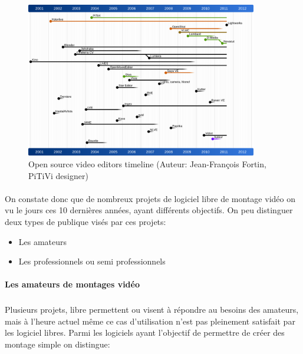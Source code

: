 \begin{figure} [h]
  \begin{center}
    \includegraphics[width=0.9\textwidth]{images/open-source-video-editor-timeline}
  \end{center} \caption{Open source video editors timeline (Auteur:
  Jean-François Fortin, PiTiVi designer)} \label{Yes}
\end{figure}

\paragraph{ }

On constate donc que de nombreux projets de logiciel libre de montage
vidéo on vu le jours ces 10 dernières années, ayant différents
objectifs.  On peu distinguer deux types de publique visés par ces
projets:

\begin {itemize}

  \item {Les amateurs}

  \item {Les professionnels ou semi professionnels}
\end {itemize}

\paragraph {Les amateurs de montages vidéo}

\subparagraph{}

Plusieurs projets, libre permettent ou visent à répondre au besoins
des amateurs, mais à l'heure actuel même ce cas d'utilisation n'est
pas pleinement satisfait par les logiciel libres. Parmi les logiciels
ayant l'objectif de permettre de créer des montage simple on distingue:

